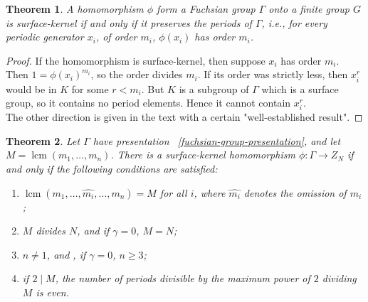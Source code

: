 \documentclass[reqno]{amsart}
\newtheorem{theorem}{Theorem}[section]
\theoremstyle{definition}
\theoremstyle{remark}
\DeclareMathOperator{\lcm}{lcm}
\begin{document}
\begin{theorem}
    A homomorphism 
    $\phi$ form a Fuchsian group $\Gamma$ onto
    a finite group $G$ is surface-kernel if and only if it preserves the periods of $\Gamma$,
    i.e., for every periodic generator
    $x_i$, of order
    $m_i$, $\phi (x_i)$ has
    order $m_i$.
\end{theorem}

\begin{proof}
    If the homomorphism is surface-kernel, then
    suppose $x_i$ has
    order $m_i$. Then
    $1 = \phi(x_i)^{m_i}$,
    so the order divides $m_i$. If its order was
    strictly less, then
    $x_i^r$ would be in $K$
    for some $r < m_i$. But
    $K$ is a subgroup of 
    $\Gamma$ which
    is a surface group, so
    it contains no period
    elements. Hence
    it cannot contain $x_i^r$.\\
    \linebreak
    The other direction is given in the text with a certain "well-established result". 
\end{proof}

\begin{theorem}
    Let $\Gamma$ have presentation ~\ref{fuchsian-group-presentation}, and
    let $M = 
    \lcm (m_1, \ldots, m_n)$.
    There is a surface-kernel
    homomorphism
    $\phi \colon \Gamma
    \to Z_N$ if and only
    if the following conditions are satisfied:
    \begin{enumerate}
        \item 
        $\lcm(m_1, \ldots,
        \hat{m_i}, \ldots
        , m_n) = M$ for
        all $i$, where
        $\hat{m_i}$ denotes
        the omission of $m_i$;
        \item $M$ divides
        $N$, and if
        $\gamma = 0$, 
        $M = N$;
        \item $n\neq 1$, and
        , if $\gamma = 0$,
        $n \geq 3$;
        \item if $2 \mid M$,
        the number of periods divisible by the maximum power of $2$ dividing $M$ is even.
    \end{enumerate}
\end{theorem}


















\newpage
\printbibliography
\end{document}
